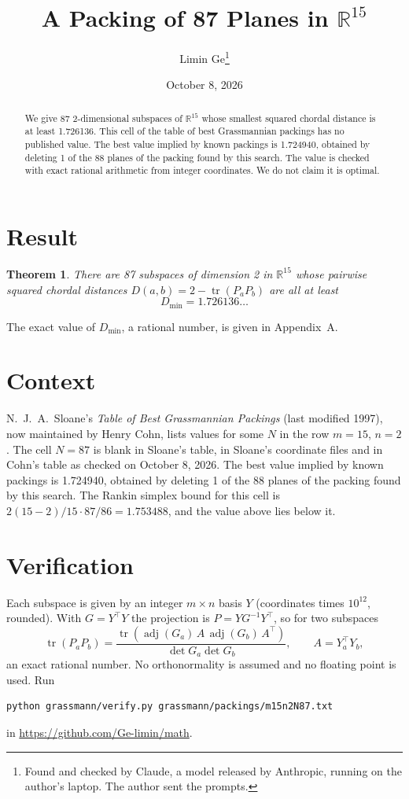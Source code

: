 \documentclass[11pt,a4paper]{article}
\title{A Packing of 87 Planes in $\mathbb{R}^{15}$}
\author{Limin Ge\thanks{Found and checked by Claude, a model released by Anthropic, running on the author's laptop. The author sent the prompts.}}
\date{October 8, 2026}
\newtheorem*{theorem}{Theorem}
\begin{document}
\maketitle
\begin{abstract}
We give 87 2-dimensional subspaces of $\mathbb{R}^{15}$ whose smallest squared chordal distance is at least 1.726136. This cell of the table of best Grassmannian packings has no published value. The best value implied by known packings is 1.724940, obtained by deleting 1 of the 88 planes of the packing found by this search. The value is checked with exact rational arithmetic from integer coordinates. We do not claim it is optimal.
\end{abstract}

\section{Result}
\begin{theorem}
There are 87 subspaces of dimension 2 in $\mathbb{R}^{15}$ whose pairwise squared chordal distances $D(a,b) = 2 - \operatorname{tr}(P_aP_b)$ are all at least
\[ D_{\min} = 1.726136\ldots \]
\end{theorem}
The exact value of $D_{\min}$, a rational number, is given in Appendix~A.


\section{Context}
N.~J.~A.~Sloane's \emph{Table of Best Grassmannian Packings} (last modified 1997), now maintained by Henry Cohn, lists values for some $N$ in the row $m=15$, $n=2$. The cell $N=87$ is blank in Sloane's table, in Sloane's coordinate files and in Cohn's table as checked on October 8, 2026. The best value implied by known packings is 1.724940, obtained by deleting 1 of the 88 planes of the packing found by this search. The Rankin simplex bound for this cell is $2(15-2)/15\cdot 87/86 = 1.753488$, and the value above lies below it.


\section{Verification}
Each subspace is given by an integer $m\times n$ basis $Y$ (coordinates times $10^{12}$, rounded). With $G=Y^\top Y$ the projection is $P=YG^{-1}Y^\top$, so for two subspaces
\[ \operatorname{tr}(P_aP_b)=\frac{\operatorname{tr}(\operatorname{adj}(G_a)\,A\,\operatorname{adj}(G_b)\,A^\top)}{\det G_a\det G_b},\qquad A=Y_a^\top Y_b, \]
an exact rational number. No orthonormality is assumed and no floating point is used. Run
\begin{verbatim}
python grassmann/verify.py grassmann/packings/m15n2N87.txt
\end{verbatim}
in \url{https://github.com/Ge-limin/math}.
\end{document}
